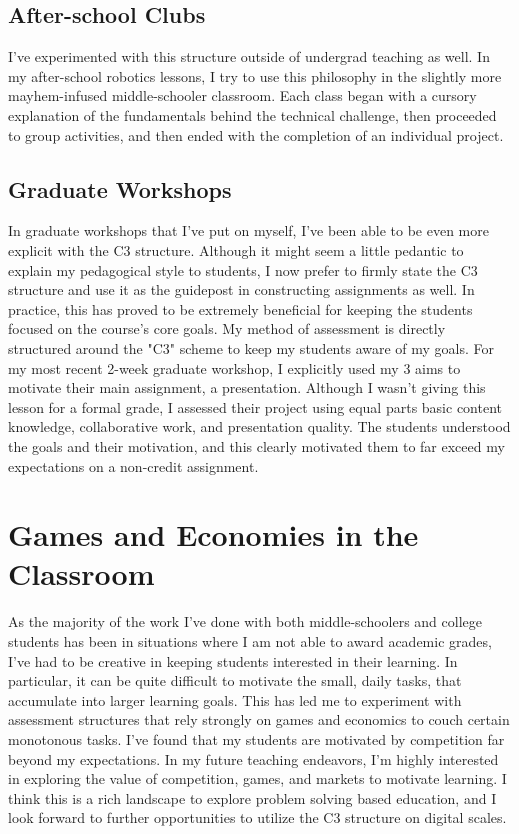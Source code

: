 \documentclass[12pt]{amsart} \usepackage{amssymb}
\begin{document}
\subsection*{After-school Clubs}
I've experimented with this structure outside of undergrad teaching as well.  In my after-school robotics lessons, I try to use this philosophy in the slightly more mayhem-infused middle-schooler classroom. Each class began with a cursory explanation of the fundamentals behind the technical challenge, then proceeded to group activities, and then ended with the completion of an individual project.  


\subsection*{Graduate Workshops}
In graduate workshops that I've put on myself, I've been able to be even more explicit with the C3 structure. Although it might seem a little pedantic to explain my pedagogical style to students, I now prefer to firmly state the C3 structure and use it as the guidepost in constructing assignments as well.  In practice, this has proved to be extremely beneficial for keeping the students focused on the course's core goals.  My method of assessment is directly structured around the "C3" scheme to keep my students aware of my goals.  For my most recent 2-week graduate workshop, I explicitly used my 3 aims to motivate their main assignment, a presentation. Although I wasn't giving this lesson for a formal grade, I assessed their project using equal parts basic content knowledge, collaborative work, and presentation quality. The students understood the goals and their motivation, and this clearly motivated them to far exceed my expectations on a non-credit assignment.  

\section*{Games and Economies in the Classroom}
As the majority of the work I've done with both middle-schoolers and college students has been in situations where I am not able to award academic grades, I've had to be creative in keeping students interested in their learning.  In particular, it can be quite difficult to motivate the small, daily tasks, that accumulate into larger learning goals.  This has led me to experiment with assessment structures that rely strongly on games and economics to couch certain monotonous tasks.  I've found that my students are motivated by competition far beyond my expectations.  In my future teaching endeavors, I'm highly interested in exploring the value of competition, games, and markets to motivate learning.  I think this is a rich landscape to explore problem solving based education, and I look forward to further opportunities to utilize the C3 structure on digital scales.
\end{document}
